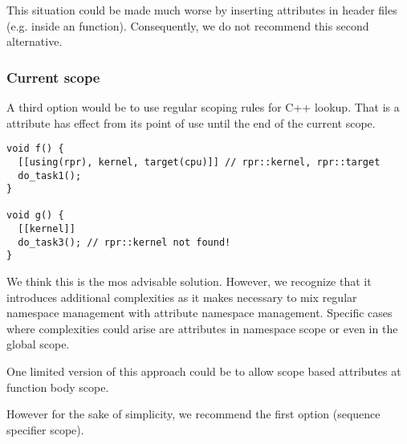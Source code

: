This situation could be made much worse by inserting  attributes
in header files (e.g. inside an  function). Consequently, we
do not recommend this second alternative.

\subsubsection{Current scope}

A third option would be to use regular scoping rules for C++ lookup. That is
a  attribute has effect from its point of use until the end of
the current scope.

\begin{lstlisting}
void f() {
  [[using(rpr), kernel, target(cpu)]] // rpr::kernel, rpr::target
  do_task1();
}

void g() {
  [[kernel]]
  do_task3(); // rpr::kernel not found!
}
\end{lstlisting}

We think this is the mos advisable solution. However, we recognize that it introduces
additional complexities as it makes necessary to mix regular namespace management
with attribute namespace management. Specific cases where complexities could arise
are attributes in namespace scope or even in the global scope.

One limited version of this approach could be to allow scope based 
attributes at function body scope.

However for the sake of simplicity, we recommend the first option (sequence specifier scope).
